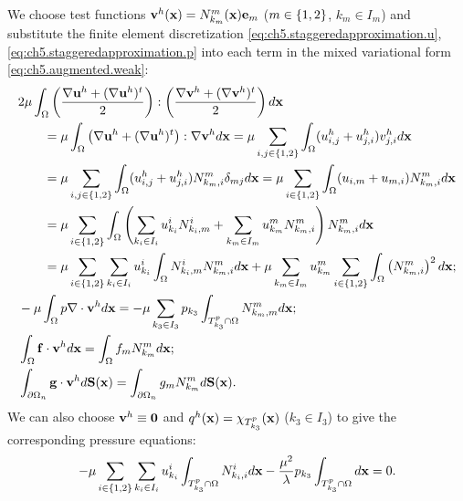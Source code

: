 We choose test functions $\mathbf{v}^h(\mathbf{x}) = N^m_{k_m}(\mathbf{x}) \mathbf{e}_m$ ($m \in \left\lbrace 1,2 \right\rbrace$, $k_m \in I_m$) and substitute the finite element discretization \eqref{eq:ch5.staggeredapproximation.u}, \eqref{eq:ch5.staggeredapproximation.p} into each term in the mixed variational form \eqref{eq:ch5.augmented.weak}:
\begin{subequations} \label{eq:ch5.integrations}
\begin{align}
& 2 \mu \int_{\Omega} \left( \frac{\nabla \mathbf{u}^h + (\nabla \mathbf{u}^h)^t}{2} \right) : \left( \frac{\nabla \mathbf{v}^h + (\nabla \mathbf{v}^h)^t}{2} \right) d\mathbf{x} \\
& \qquad = \mu \int_{\Omega} \left( \nabla \mathbf{u}^h + (\nabla \mathbf{u}^h)^t \right) : \nabla \mathbf{v}^h d\mathbf{x} = \mu \sum_{i,j \in \left\lbrace 1,2 \right\rbrace} \int_{\Omega} (u^h_{i,j} + u^h_{j,i}) v^h_{j,i} d\mathbf{x} \\
& \qquad = \mu \sum_{i,j \in \left\lbrace 1,2 \right\rbrace} \int_{\Omega} (u^h_{i,j} + u^h_{j,i}) N^m_{k_m,i} \delta_{mj} d\mathbf{x} = \mu \sum_{i \in \left\lbrace 1,2 \right\rbrace} \int_{\Omega} (u_{i,m}+u_{m,i}) N^m_{k_m,i} d\mathbf{x} \\
& \qquad = \mu \sum_{i \in \left\lbrace 1,2 \right\rbrace} \int_{\Omega} \left( \sum_{k_i \in I_i} u^i_{k_i} N^i_{k_i,m} + \sum_{k_m \in I_m} u^m_{k_m} N^m_{k_m,i} \right) N^m_{k_m,i} d\mathbf{x} \\
& \qquad = \mu \sum_{i \in \left\lbrace 1,2 \right\rbrace} \sum_{k_i \in I_i} u^i_{k_i} \int_{\Omega} N^i_{k_i,m} N^m_{k_m,i} d\mathbf{x} + \mu \sum_{k_m \in I_m} u^m_{k_m} \sum_{i \in \left\lbrace 1,2 \right\rbrace} \int_{\Omega} \left( N^m_{k_m,i} \right)^2 d\mathbf{x}; \\
& -\mu \int_{\Omega} p \nabla \cdot \mathbf{v}^h d\mathbf{x} = -\mu \sum_{k_3 \in I_3} p_{k_3} \int_{T^p_{k_3} \cap \Omega} N^m_{k_m,m} d\mathbf{x}; \\
& \int_{\Omega} \mathbf{f} \cdot \mathbf{v}^h d\mathbf{x} = \int_{\Omega} f_m N^m_{k_m} d\mathbf{x}; \\
& \int_{\partial\Omega_n} \mathbf{g} \cdot \mathbf{v}^h d\mathbf{S}(\mathbf{x}) = \int_{\partial\Omega_n} g_m N^m_{k_m} d\mathbf{S}(\mathbf{x}).
\end{align}
\end{subequations}
We can also choose $\mathbf{v}^h \equiv \mathbf{0}$ and $q^h(\mathbf{x}) = \chi_{T^p_{k_3}}(\mathbf{x})$ ($k_3 \in I_3$) to give the corresponding pressure equations:
\begin{equation*}
-\mu \sum_{i \in \left\lbrace 1,2 \right\rbrace} \sum_{k_i \in I_i} u^i_{k_i} \int_{T^p_{k_3} \cap \Omega} N^i_{k_i,i} d\mathbf{x} - \frac{\mu^2}{\lambda} p_{k_3} \int_{T^p_{k_3} \cap \Omega} d\mathbf{x} = 0.
\end{equation*}

